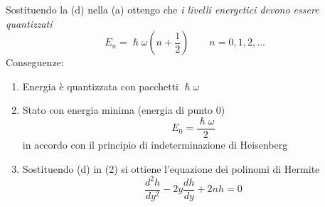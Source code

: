 \begin{itemize}
    Sostituendo la (d) nella (a) ottengo che \textit{i livelli energetici devono essere quantizzati}
    \begin{equation*}
        E_n = \hslash \omega \left(n + \frac{1}{2}\right) \qquad n = 0,1,2, \dots 
    \end{equation*}
    Conseguenze:
    \begin{enumerate}
        \item Energia è quantizzata con pacchetti \(\hslash \omega \)
        \item Stato con energia minima (energia di punto 0)
        \begin{equation*}
            E_0 = \frac{\hslash\omega}{2}
        \end{equation*}
        in accordo con il principio di indeterminazione di Heisenberg
        \item Sostituendo (d) in (2) si ottiene l'equazione dei polinomi di Hermite
        \begin{equation*}
            \frac{d^2h}{dy^2} - 2y \frac{dh}{dy} + 2nh = 0
        \end{equation*}
    \end{enumerate}
    

\end{itemize}
